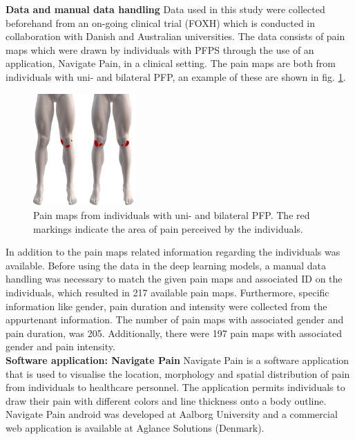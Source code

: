 \textbf{Data and manual data handling} \newline
Data used in this study were collected beforehand from an on-going clinical trial (FOXH) which is conducted in collaboration with Danish and Australian universities. The data consists of pain maps which were drawn by individuals with PFPS through the use of an application, Navigate Pain, in a clinical setting. The pain maps are both from individuals with uni- and bilateral PFP, an example of these are shown in fig. \ref{fig:twoPainmaps}.

\begin{figure}[H]
\centering
\includegraphics[width=0.35\textwidth]{Figures/twoPainmaps}
\caption{Pain maps from individuals with uni- and bilateral PFP. The red markings indicate the area of pain perceived by the individuals.}
\label{fig:twoPainmaps}
\end{figure}

\noindent
In addition to the pain maps related information regarding the individuals was available.
Before using the data in the deep learning models, a manual data handling was necessary to match the given pain maps and associated ID on the individuals, which resulted in 217 available pain maps. Furthermore, specific information like gender, pain duration and intensity were collected from the appurtenant information. The number of pain maps with associated gender and pain duration, was 205. Additionally, there were 197 pain maps with associated gender and pain intensity.\\

\noindent
\textbf{Software application: Navigate Pain} \newline
Navigate Pain is a software application that is used to visualise the location, morphology and spatial distribution of pain from individuals to healthcare personnel. The application permits individuals to draw their pain with different colors and line thickness onto a body outline. Navigate Pain android was developed at Aalborg University and a commercial web application is available at Aglance Solutions (Denmark).\citep{Solutions2015}\\

